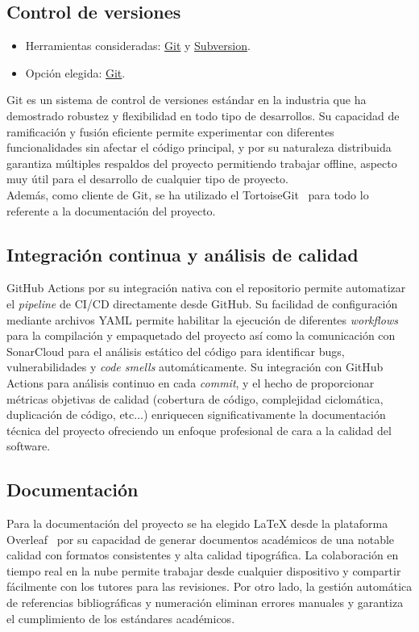 \subsection{Control de versiones}\label{control-de-versiones}

\begin{itemize}
\tightlist
\item
  Herramientas consideradas: \href{https://git-scm.com/}{Git} y
  \href{https://subversion.apache.org/}{Subversion}.
\item
  Opción elegida: \href{https://git-scm.com/}{Git}.
\end{itemize}

Git es un sistema de control de versiones estándar en la industria que ha demostrado robustez y flexibilidad en todo tipo de desarrollos. Su capacidad de ramificación y fusión eficiente permite experimentar con diferentes funcionalidades sin afectar el código principal, y por su naturaleza distribuida garantiza múltiples respaldos del proyecto permitiendo trabajar offline, aspecto muy útil para el desarrollo de cualquier tipo de proyecto.\\
Además, como cliente de Git, se ha utilizado el TortoiseGit~\cite{tortoisegit} para todo lo referente a la documentación del proyecto.

\subsection{Integración continua y análisis de calidad}\label{integracion-continua-analisis-calidad}
GitHub Actions por su integración nativa con el repositorio permite automatizar el \emph{pipeline} de CI/CD directamente desde GitHub. Su facilidad de configuración mediante archivos YAML permite habilitar la ejecución de diferentes \emph{workflows} para la compilación y empaquetado del proyecto así como la comunicación con SonarCloud para el análisis estático del código para identificar bugs, vulnerabilidades y \emph{code smells} automáticamente. Su integración con GitHub Actions para análisis continuo en cada \emph{commit}, y el hecho de proporcionar métricas objetivas de calidad (cobertura de código, complejidad ciclomática, duplicación de código, etc...) enriquecen significativamente la documentación técnica del proyecto ofreciendo un enfoque profesional de cara a la calidad del software.

\subsection{Documentación}\label{documentacion}
Para la documentación del proyecto se ha elegido \LaTeX{} desde la plataforma Overleaf~\cite{overleaf} por su capacidad de generar documentos académicos de una notable calidad con formatos consistentes y alta calidad tipográfica. La colaboración en tiempo real en la nube permite trabajar desde cualquier dispositivo y compartir fácilmente con los tutores para las revisiones. Por otro lado, la gestión automática de referencias bibliográficas y numeración eliminan errores manuales y garantiza el cumplimiento de los estándares académicos.

